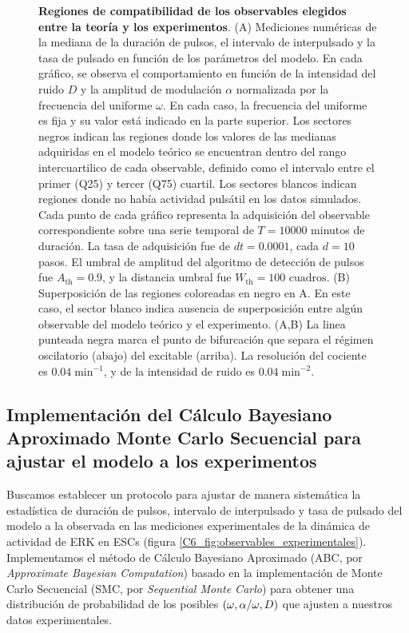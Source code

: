 \documentclass[./main.tex]{subfiles}
\begin{document}
\begin{figure}
    \caption{\textbf{Regiones de compatibilidad de los observables elegidos entre la teoría y los experimentos}. (A) Mediciones numéricas de la mediana de la duración de pulsos, el intervalo de interpulsado y la tasa de pulsado en función de los parámetros del modelo. En cada gráfico, se observa el comportamiento en función de la intensidad del ruido $D$ y la amplitud de modulación $\alpha$ normalizada por la frecuencia del uniforme $\omega$. En cada caso, la frecuencia del uniforme es fija y su valor está indicado en la parte superior. Los sectores negros indican las regiones donde los valores de las medianas adquiridas en el modelo teórico se encuentran dentro del rango intercuartilico de cada observable, definido como el intervalo entre el primer (Q25) y tercer (Q75) cuartil. Los sectores blancos indican regiones donde no había actividad pulsátil en los datos simulados. Cada punto de cada gráfico representa la adquisición del observable correspondiente sobre una serie temporal de $T = 10000$ minutos de duración. La tasa de adquisición fue de $dt = 0.0001$, cada $d = 10$ pasos. El umbral de amplitud del algoritmo de detección de pulsos fue $A_{\text{th}} = 0.9$, y la distancia umbral fue $W_{\text{th}} = 100\text{ cuadros}$. (B) Superposición de las regiones coloreadas en negro en A. En este caso, el sector blanco indica ausencia de superposición entre algún observable del modelo teórico y el experimento. (A,B) La linea punteada negra marca el punto de bifurcación que separa el régimen oscilatorio (abajo) del excitable (arriba). La resolución del cociente \dddelta es $0.04\; \text{min}^{-1}$, y de la intensidad de ruido es $0.04\; \text{min}^{-2}$.}
    \label{C6_fig:2d_plots_sup}
\end{figure}




\subsection{Implementación del Cálculo Bayesiano Aproximado Monte Carlo Secuencial para ajustar el modelo a los experimentos}
\label{C6_sssec:implementac_ABCSMC}

Buscamos establecer un protocolo para ajustar de manera sistemática la estadística de duración de pulsos, intervalo de interpulsado y tasa de pulsado del modelo a la observada en las mediciones experimentales de la dinámica de actividad de ERK en ESCs (figura \ref{C6_fig:observables_experimentales}). Implementamos el método de Cálculo Bayesiano Aproximado (ABC, por \textit{Approximate Bayesian Computation}) basado en la implementación de Monte Carlo Secuencial (SMC, por \textit{Sequential Monte Carlo}) para obtener una distribución de probabilidad de los posibles $(\omega,\alpha/\omega,D)$ que ajusten a nuestros datos experimentales.
\end{document}
